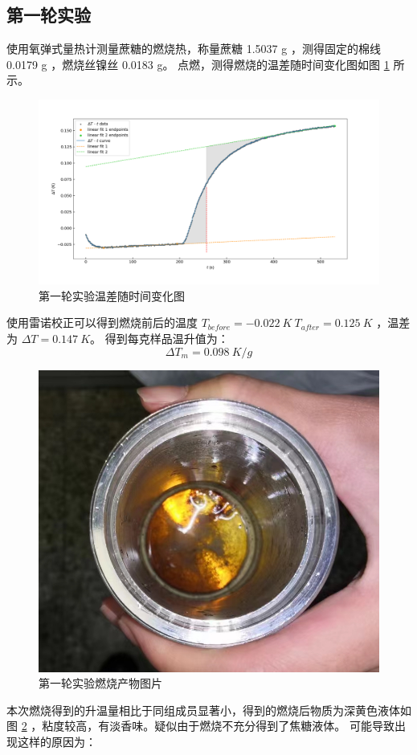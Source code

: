 \documentclass[cn,hazy,pku,12pt,normal,math=newtx,cite=super]{elegantnote}
\begin{document}
\subsection[short]{第一轮实验}
使用氧弹式量热计测量蔗糖的燃烧热，称量蔗糖 1.5037 g ，测得固定的棉线 0.0179 g ，燃烧丝镍丝 0.0183 g。
点燃，测得燃烧的温差随时间变化图如图 \ref{4} 所示。

\begin{figure}[htbp]
    \centering
    \includegraphics[width = .90\textwidth]{image/r1.png}
    \caption{第一轮实验温差随时间变化图}\label{4}
\end{figure}

使用雷诺校正可以得到燃烧前后的温度 $T_{before} = -0.022\ K\ T_{after} = 0.125\ K$ ，温差为 $\Delta T = 0.147\ K$。
得到每克样品温升值为：
$$
\Delta T_m = 0.098\ K/g
$$

\begin{figure}[htbp]
    \centering
    \includegraphics[width = .70\textwidth]{image/cwtp.jpg}
    \caption{第一轮实验燃烧产物图片}\label{5}
\end{figure}

本次燃烧得到的升温量相比于同组成员显著小，得到的燃烧后物质为深黄色液体如图 \ref{5} ，粘度较高，有淡香味。疑似由于燃烧不充分得到了焦糖液体。
可能导致出现这样的原因为：
\end{document}
